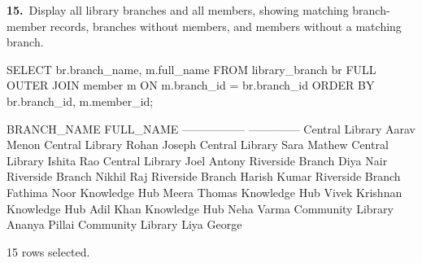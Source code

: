 \noindent\begin{minipage}{\linewidth}
\begingroup{}
{\fontsize{14}{17}\selectfont\textbf{15.}}\ Display all library branches and all members, showing matching branch-member records, branches without members, and members without a matching branch.\par
\endgroup\vspace{12pt}


\begin{sqlcode}
SELECT br.branch_name, m.full_name
FROM library_branch br
FULL OUTER JOIN member m ON m.branch_id = br.branch_id
ORDER BY br.branch_id, m.member_id;
\end{sqlcode}

\vspace{18pt}


\begin{sqlout}[fontsize=\small]
BRANCH_NAME        FULL_NAME     
-----------------  --------------
Central Library    Aarav Menon
Central Library    Rohan Joseph
Central Library    Sara Mathew
Central Library    Ishita Rao
Central Library    Joel Antony
Riverside Branch   Diya Nair
Riverside Branch   Nikhil Raj
Riverside Branch   Harish Kumar
Riverside Branch   Fathima Noor
Knowledge Hub      Meera Thomas
Knowledge Hub      Vivek Krishnan
Knowledge Hub      Adil Khan
Knowledge Hub      Neha Varma
Community Library  Ananya Pillai
Community Library  Liya George

15 rows selected.
\end{sqlout}
\end{minipage}\par\vspace{24pt}

